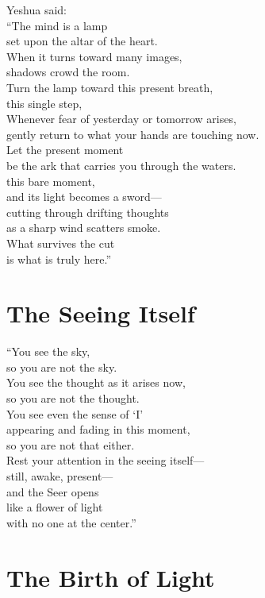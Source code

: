 \documentclass[10pt, openright]{book}
\newcommand{\sectionbreak}{\filbreak}
\begin{document}
Yeshua said:\\
``The mind is a lamp\\
set upon the altar of the heart.\\
When it turns toward many images,\\
shadows crowd the room.\\
Turn the lamp toward this present breath,\\
this single step,\\
Whenever fear of yesterday or tomorrow arises,\\
gently return to what your hands are touching now.\\
Let the present moment\\
be the ark that carries you through the waters.\\
this bare moment,\\
and its light becomes a sword---\\
cutting through drifting thoughts\\
as a sharp wind scatters smoke.\\
What survives the cut\\
is what is truly here.''

\sectionbreak

\section{The Seeing Itself}\label{the-seeing-itself}

``You see the sky,\\
so you are not the sky.\\
You see the thought as it arises now,\\
so you are not the thought.\\
You see even the sense of `I'\\
appearing and fading in this moment,\\
so you are not that either.\\
Rest your attention in the seeing itself---\\
still, awake, present---\\
and the Seer opens\\
like a flower of light\\
with no one at the center.''

\sectionbreak

\section{The Birth of Light}\label{the-birth-of-light}
\end{document}
